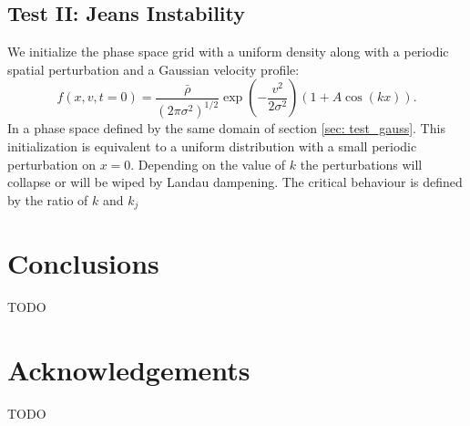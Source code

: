 \documentclass[fleqn,usenatbib]{mnras}
\begin{document}
\subsection{Test II: Jeans Instability}
We initialize the phase space grid with a uniform density along with a periodic spatial perturbation and a Gaussian velocity profile:
\begin{equation}
f(x,v,t = 0) = \frac{\bar{\rho}}{(2\pi \sigma^2)^{1/2}} \exp(-\frac{v^2}{2 \sigma^2}) (1 + A\cos(kx)).
\end{equation} 
In a phase space defined by the same domain of section \ref{sec: test_gauss}. This initialization is equivalent to a uniform distribution with a small periodic perturbation on $x = 0$. Depending on the value of $k$ the perturbations will collapse or will be wiped by Landau dampening. The critical behaviour is defined by the ratio of $k$ and $k_j$


\section{Conclusions}

TODO

\section*{Acknowledgements}

TODO









\appendix



\bsp	%
\label{lastpage}
\end{document}
